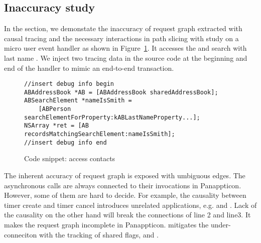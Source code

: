 \subsection{Inaccuracy study} \label{sec:toystudy}

In the section, we demonstate the inaccuracy of request graph extracted with
causal tracing and the necessary interactions in path slicing with study on
a micro user event handler as shown in Figure~\ref{fig:toyapp}. It accesses the
 and search with last name . We inject two tracing
data in the source code at the beginning and end of the handler to mimic an
end-to-end transaction.

\begin{figure}[t]
\begin{lstlisting}
//insert debug info begin
ABAddressBook *AB = [ABAddressBook sharedAddressBook];
ABSearchElement *nameIsSmith =
	[ABPerson searchElementForProperty:kABLastNameProperty...];
NSArray *ret = [AB recordsMatchingSearchElement:nameIsSmith]; 
//insert debug info end
\end{lstlisting}
    \caption{Code snippet: access contacts}
    \label{fig:toyapp}
\end{figure}


The inherent accuracy of request graph is exposed with umbiguous edges. The
asynchronous calls are always connected to their invocations in Panappticon.
However, some of them are hard to decide. For example, the causality between
timer create and timer cancel introduces unrelated applications, e.g. 
and . Lack of the causality on the other hand will break the
connections of line 2 and line3. It makes the request graph incomplete in
Panappticon. \xxx mitigates the under-conneciton with the tracking of shared
flags,  and .

